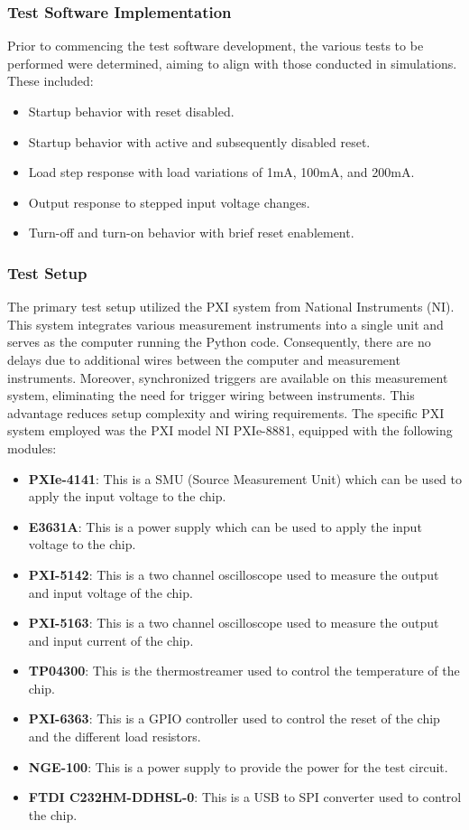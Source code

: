 \subsubsection{Test Software Implementation}
Prior to commencing the test software development, the various tests to be performed were determined, aiming to align with those conducted in simulations. These included:
\begin{itemize}
    \item Startup behavior with reset disabled.
    \item Startup behavior with active and subsequently disabled reset.
    \item Load step response with load variations of 1mA, 100mA, and 200mA.
    \item Output response to stepped input voltage changes.
    \item Turn-off and turn-on behavior with brief reset enablement.
\end{itemize}

\subsubsection{Test Setup}
The primary test setup utilized the PXI system from National Instruments (NI). This system integrates various measurement instruments into a single unit and serves as the computer running the Python code. Consequently, there are no delays due to additional wires between the computer and measurement instruments. Moreover, synchronized triggers are available on this measurement system, eliminating the need for trigger wiring between instruments. This advantage reduces setup complexity and wiring requirements. The specific PXI system employed was the PXI model \glqq{}NI PXIe-8881\grqq{}, equipped with the following modules:

\begin{itemize}
    \item \textbf{PXIe-4141}: This is a SMU (Source Measurement Unit) which can be used to apply the input voltage to the chip.
    \item \textbf{E3631A}: This is a power supply which can be used to apply the input voltage to the chip.
    \item \textbf{PXI-5142}: This is a two channel oscilloscope used to measure the output and input voltage of the chip.
    \item \textbf{PXI-5163}: This is a two channel oscilloscope used to measure the output and input current of the chip.
    \item \textbf{TP04300}: This is the thermostreamer used to control the temperature of the chip.
    \item \textbf{PXI-6363}: This is a GPIO controller used to control the reset of the chip and the different load resistors.
    \item \textbf{NGE-100}: This is a power supply to provide the power for the test circuit.
    \item \textbf{FTDI C232HM-DDHSL-0}: This is a USB to SPI converter used to control the chip.
\end{itemize}

